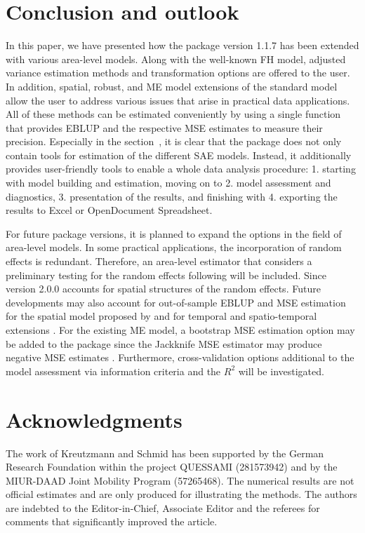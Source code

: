 \section[Conclusion and outlook]{Conclusion and outlook}\label{sec:concl}
In this paper, we have presented how the  package version 1.1.7 has been extended with various area-level models. Along with the well-known FH model, adjusted variance estimation methods and transformation options are offered to the user. In addition, spatial, robust, and ME model extensions of the standard model allow the user to address various issues that arise in practical data applications. All of these methods can be estimated conveniently by using a single function that provides EBLUP and the respective MSE estimates to measure their precision. Especially in the section~, it is clear that the package does not only contain tools for estimation of the different SAE models. Instead, it additionally provides user-friendly tools to enable a whole data analysis procedure: 1. starting with model building and estimation, moving on to 2. model assessment and diagnostics, 3. presentation of the results, and finishing with 4. exporting the results to Excel or OpenDocument Spreadsheet.

For future package versions, it is planned to expand the options in the field of area-level models.  In some practical applications, the incorporation of random effects is redundant. Therefore, an area-level estimator that considers a preliminary testing for the random effects following \citet{Molina2015a} will be included. Since version 2.0.0  accounts for spatial structures of the random effects. Future developments may also account for out-of-sample EBLUP and MSE estimation for the spatial model proposed by \citet{Saei2005} and for temporal and spatio-temporal extensions \citep{Rao1994, Marhuenda2013}. For the existing ME model, a bootstrap MSE estimation option may  be added to the package since the Jackknife MSE estimator may produce negative MSE estimates \citep{Marchetti2015}. Furthermore, cross-validation options additional to the model assessment via information criteria and the $R^2$ will be investigated.
\section{Acknowledgments}\label{sec:Acknowledgments}
The work of Kreutzmann and Schmid has been supported by the German Research Foundation within the project QUESSAMI (281573942) and by the MIUR-DAAD Joint Mobility Program (57265468). The numerical results are not official estimates and are only produced for illustrating the methods.
The authors are indebted to the Editor-in-Chief, Associate Editor and the referees for comments that significantly improved the article.

